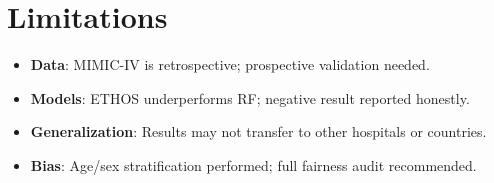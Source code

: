 \section{Limitations}

\begin{itemize}
\item \textbf{Data}: MIMIC-IV is retrospective; prospective validation needed.
\item \textbf{Models}: ETHOS underperforms RF; negative result reported honestly.
\item \textbf{Generalization}: Results may not transfer to other hospitals or countries.
\item \textbf{Bias}: Age/sex stratification performed; full fairness audit recommended.
\end{itemize}
